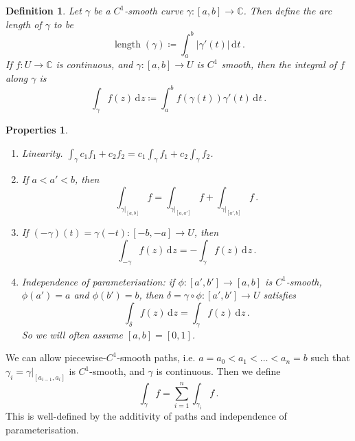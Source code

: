 \documentclass{article}
\theoremstyle{plain}\theoremheaderfont{\normalfont\itshape}\theorembodyfont{\rmfamily}\theoremseparator{.}\newtheorem*{rem}{Remark}\newtheorem*{ex}{Example}\newtheorem*{proof}{Proof}\newtheorem*{altp}{Alternative proof}\newtheorem*{con}{Consequences}\newtheorem*{notn}{Notations}\newtheorem*{cau}{Caution}\newtheorem*{term}{Terminology}\newtheorem*{keyex}{Key example}
\theoremstyle{plain}\theoremheaderfont{\normalfont\bfseries}\theorembodyfont{\rmfamily}\theoremseparator{.}\newtheorem{thm}{Theorem}[section]\newtheorem{lem}[thm]{Lemma}\newtheorem{prop}[thm]{Proposition}\newtheorem*{cor}{Corollary}\newtheorem{defn}[thm]{Definition}\newtheorem{clm}[thm]{Claim}\newtheorem{clminproof}{Claim}\newtheorem{leminproof}{Lemma}\newtheorem{app}{Application}
\theoremstyle{break}\theoremheaderfont{\normalfont\itshape}\theorembodyfont{\rmfamily}\theoremseparator{.\medskip}\newtheorem*{proofskip}{Proof}\newtheorem*{exs}{Examples}\newtheorem*{rems}{Remarks}\newtheorem*{rec}{Recall}\newtheorem*{ppts}{Properties}
\theoremstyle{break}\theoremheaderfont{\normalfont\bfseries}\theorembodyfont{\rmfamily}\theoremseparator{.\medskip}\newtheorem{lemskip}[thm]{Lemma}\newtheorem{defnskip}[thm]{Definition}\newtheorem{propskip}[thm]{Proposition}\newtheorem{thmskip}[thm]{Theorem}
\numberwithin{equation}{section}
\DeclareMathOperator*{\length}{length}
\newcommand{\abs}[1]{\left|#1\right|}
\newcommand{\dd}[2][]{\,\mathrm{d}^{#1} #2}
\newcommand{\CC}{\mathbb{C}}
\begin{document}
    \begin{defn}
        Let \(\gamma\) be a \(C^1\)-smooth curve \(\gamma:[a,b]\to\mathbb{C}\). Then define the arc length of \(\gamma\) to be
        \[\length(\gamma)\coloneqq\int_{a}^{b}\abs{\gamma'(t)}\dd{t}\,.\]
        If \(f:U\to\CC\) is continuous, and \(\gamma:[a,b]\to U\) is \(C^1\) smooth, then the integral of \(f\) along \(\gamma\) is
        \[\int_\gamma f(z)\dd{z}\coloneqq\int_{a}^{b}f(\gamma(t))\gamma'(t)\dd{t}\,.\]
    \end{defn}
    \begin{ppts}
        \begin{enumerate}[topsep=0pt,label=(\roman*)]
            \item Linearity. \(\int_\gamma c_1f_1+c_2f_2=c_1\int_\gamma f_1+c_2\int_\gamma f_2\).
            \item If \(a<a'<b\), then
            \[\int_{\gamma|_{[a,b]}}f=\int_{\gamma|_{[a,a']}}f+\int_{\gamma|_{[a',b]}}f\,.\]
            \item If \((-\gamma)(t)=\gamma(-t):[-b,-a]\to U\), then
            \[\int_{-\gamma}f(z)\dd{z}=-\int_\gamma f(z)\dd{z}\,.\]
            \item Independence of parameterisation: if \(\phi:[a',b']\to[a,b]\) is \(C^1\)-smooth, \(\phi(a')=a\) and \(\phi(b')=b\), then \(\delta=\gamma\circ\phi:[a',b']\to U\) satisfies
            \[\int_{\delta}f(z)\dd{z}=\int_\gamma f(z)\dd{z}\,.\]
            So we will often assume \([a,b]=[0,1]\).
        \end{enumerate}
    \end{ppts}

    We can allow piecewise-\(C^1\)-smooth paths, i.e. \(a=a_0<a_1<\dots<a_n=b\) such that \(\gamma_i=\gamma|_{[a_{i-1},a_i]}\) is \(C^1\)-smooth, and \(\gamma\) is continuous. Then we define
    \[\int_{\gamma}f=\sum_{i=1}^{n}\int_{\gamma_i}f\,.\]
    This is well-defined by the additivity of paths and independence of parameterisation.
\end{document}

